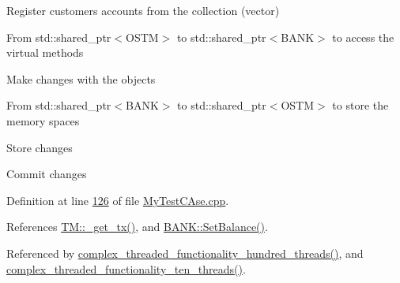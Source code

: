 Register customers accounts from the collection (vector)

From std\+::shared\+\_\+ptr$<$\+O\+S\+T\+M$>$ to std\+::shared\+\_\+ptr$<$\+B\+A\+N\+K$>$ to access the virtual methods

Make changes with the objects

From std\+::shared\+\_\+ptr$<$\+B\+A\+N\+K$>$ to std\+::shared\+\_\+ptr$<$\+O\+S\+T\+M$>$ to store the memory spaces

Store changes

Commit changes

Definition at line \hyperlink{_my_test_c_ase_8cpp_source_l00126}{126} of file \hyperlink{_my_test_c_ase_8cpp_source}{My\+Test\+C\+Ase.\+cpp}.



References \hyperlink{_t_m_8cpp_source_l00079}{T\+M\+::\+\_\+get\+\_\+tx()}, and \hyperlink{_b_a_n_k_8h_source_l00046}{B\+A\+N\+K\+::\+Set\+Balance()}.



Referenced by \hyperlink{_my_test_c_ase_8cpp_source_l00412}{complex\+\_\+threaded\+\_\+functionality\+\_\+hundred\+\_\+threads()}, and \hyperlink{_my_test_c_ase_8cpp_source_l00467}{complex\+\_\+threaded\+\_\+functionality\+\_\+ten\+\_\+threads()}.


